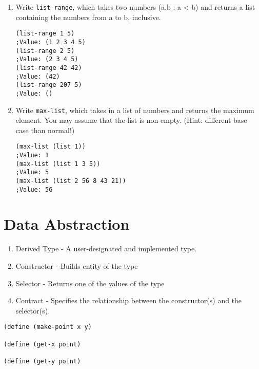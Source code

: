 \begin{enumerate}
\item Write {\tt list-range}, which takes two numbers (a,b : a < b)
and returns a list containing the numbers from a to b, inclusive.

\begin{verbatim}
(list-range 1 5)
;Value: (1 2 3 4 5)
(list-range 2 5)
;Value: (2 3 4 5)
(list-range 42 42)
;Value: (42)
(list-range 207 5)
;Value: ()
\end{verbatim}
\vspace{1in}

\item Write {\tt max-list}, which takes in a list of numbers and
returns the maximum element.  You may assume that the list is
non-empty.  (Hint: different base case than normal!)
\begin{verbatim}
(max-list (list 1))
;Value: 1
(max-list (list 1 3 5))
;Value: 5
(max-list (list 2 56 8 43 21))
;Value: 56
\end{verbatim}
\vspace{1in}
\end{enumerate}

\section*{Data Abstraction}

\begin{enumerate}
\item Derived Type - A user-designated and implemented type.
\item Constructor - Builds entity of the type
\item Selector - Returns one of the values of the type
\item Contract - Specifies the relationship between the constructor(s)
and the selector(s).
\end{enumerate}

\begin{verbatim}
(define (make-point x y)

(define (get-x point)

(define (get-y point)

\end{verbatim}

